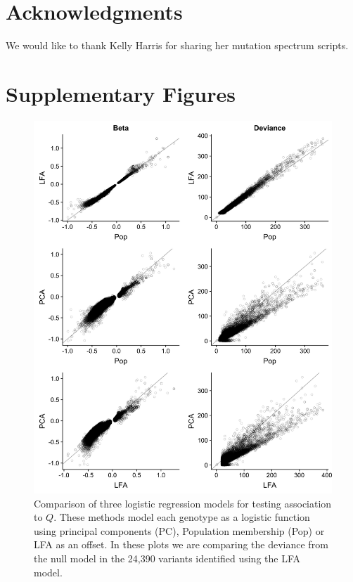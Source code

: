 \documentclass[9pt,lineno]{elife}
\begin{document}
\section{Acknowledgments}
We would like to thank Kelly Harris for sharing her mutation spectrum scripts.



\clearpage
\section{Supplementary Figures}

\begin{figure}[h]
\centering
\includegraphics[width=15cm,keepaspectratio]{./Figures/fits_Significant_Positions_CompareModels.jpg}
\caption{Comparison of three logistic regression models for testing association to $Q$.
These methods model each genotype as a logistic function using principal components (PC), Population membership (Pop) or LFA as an offset.
In these plots we are comparing the deviance from the null model in the 24,390 variants identified using the LFA model.}  
\label{CompareModel}
\end{figure}
\end{document}
